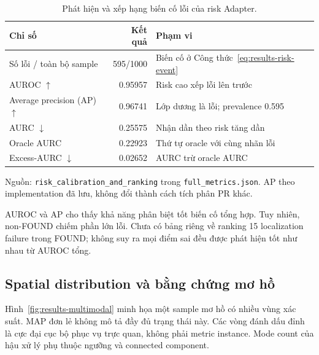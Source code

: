 \begin{table}[htbp]
    \centering
    \setlength{\tabcolsep}{4pt}
    \renewcommand{\arraystretch}{1.15}
    \caption{Phát hiện và xếp hạng biến cố lỗi của risk Adapter.}
    \label{tab:results-error-ranking}
    \small
    \begin{tabularx}{\textwidth}{@{}>{\raggedright\arraybackslash}Xr>{\raggedright\arraybackslash}X@{}}
        \toprule
        Chỉ số & Kết quả & Phạm vi \\
        \midrule
        Số lỗi / toàn bộ sample & 595/1000 &
        Biến cố ở Công thức~\eqref{eq:results-risk-event} \\
        AUROC $\uparrow$ & 0.95957 & Risk cao xếp lỗi lên trước \\
        Average precision (AP) $\uparrow$ & 0.96741 &
        Lớp dương là lỗi; prevalence 0.595 \\
        AURC $\downarrow$ & 0.25575 & Nhận dần theo risk tăng dần \\
        Oracle AURC & 0.22923 & Thứ tự oracle với cùng nhãn lỗi \\
        Excess-AURC $\downarrow$ & 0.02652 & AURC trừ oracle AURC \\
        \bottomrule
    \end{tabularx}
    \vspace{2pt}
    {\footnotesize\raggedright Nguồn: \texttt{risk\_\allowbreak calibration\_\allowbreak and\_\allowbreak ranking}
    trong \texttt{full\_\allowbreak metrics.json}. AP theo implementation
    đã lưu, không đổi thành cách tích phân PR khác.\par}
\end{table}

AUROC và AP cho thấy khả năng phân biệt tốt biến cố
tổng hợp. Tuy nhiên, non-FOUND chiếm phần lớn lỗi.
Chưa có bảng riêng về ranking 15 localization
failure trong FOUND; không suy ra mọi điểm sai
đều được phát hiện tốt như nhau từ AUROC tổng.

\subsection{Spatial distribution và bằng chứng mơ hồ}

Hình~\ref{fig:results-multimodal} minh họa một
sample mơ hồ có nhiều vùng xác suất. MAP đơn lẻ
không mô tả đầy đủ trạng thái này. Các vòng đánh
dấu đỉnh là cực đại cục bộ phục vụ trực quan,
không phải metric instance. Mode count của hậu
xử lý phụ thuộc ngưỡng và connected component.

